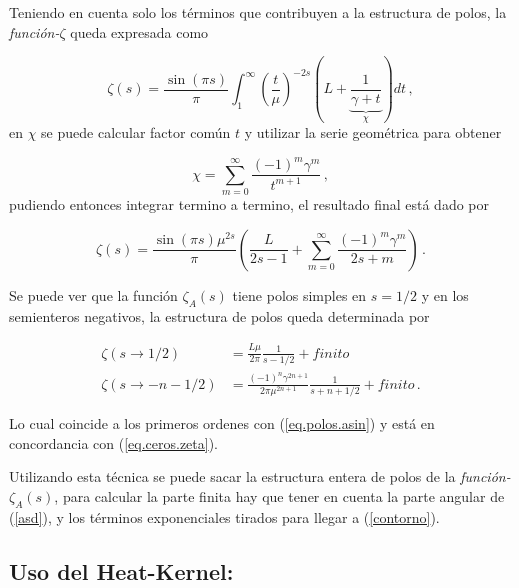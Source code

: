Teniendo en cuenta solo los términos que contribuyen a la estructura de polos, la {\it función-$\zeta$} queda expresada como

\begin{equation}
	\zeta  (s) = 
    \frac{ \sin (\pi s)}{ \pi } 
    \int _1 ^{\infty} 
    \left( \frac{t}{\mu}  \right)^{-2s}
    \left(
    	L + 
	    \underbrace
    	{
		\frac{1}{\gamma + t}   
		} _{\chi} 
	\right)
    dt  \,  ,
\label{contorno}
\end{equation}
en $\chi$ se puede calcular factor común $t$ y utilizar la serie geométrica para obtener

\begin{equation}
    \chi =   \sum _{m=0} ^{\infty} \frac{(-1) ^{m} \gamma ^{m} }{t ^{m+1}}
    \, ,
\label{eq:chi}
\end{equation}
pudiendo entonces integrar termino a termino, el resultado final está dado por

\begin{equation}
    \zeta  (s) = 
    \frac{ \sin(\pi s) \mu ^{2s }}{\pi } 
    \left(
    \frac{L}{2s-1} + 
    \sum _{m=0} ^{\infty}
    \frac{(-1) ^{m} \gamma ^{m} }{2s+m}
    \right) \, .
\label{eq.zeta.com}
\end{equation}

Se puede ver que la función $\zeta _A (s)$ tiene polos simples en $s=1/2$ y en los semienteros negativos, la estructura de polos queda determinada por

\begin{equation}
\begin{aligned}
\zeta(s \rightarrow 1/2) &= \frac{L \mu }{2 \pi} \frac{1}{s-1/2} + finito \\
\zeta (s \rightarrow -n - 1/2)  &= \frac{ (-1) ^n \gamma ^{2n+1}  }{2 \pi \mu ^{2n + 1}} \frac{1}{s + n + 1/2} + finito
\, .
\end{aligned}
\label{eq.polos.complejo}
\end{equation}


Lo cual coincide a los primeros ordenes con (\ref{eq.polos.asin}) y está en concordancia  con (\ref{eq.ceros.zeta}).

Utilizando esta técnica se puede sacar la estructura entera de polos de la {\it función-$\zeta _A (s)$}, para calcular la parte finita hay que tener en cuenta la parte angular de (\ref{asd}), y los términos exponenciales tirados para llegar a (\ref{contorno}).


\subsection{Uso del Heat-Kernel:}

